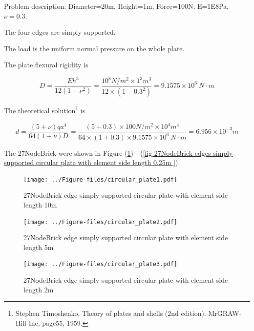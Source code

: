 \documentclass[fleqn,11pt]{article}
\begin{document}
Problem description: Diameter=20m, Height=1m, Force=100N, E=1E8Pa, $\nu=0.3$. 

The four edges are simply supported. 

The load is the uniform normal pressure on the whole plate. 


The plate flexural rigidity is 

\begin{equation}
  D=\frac{Eh^3}{12(1-\nu^2)}=\frac{10^8 N/m^2 \times 1^3 m^3 }{12 \times (1-0.3^2) }= 9.1575 \times 10^6 \ N\cdot m
\end{equation}

The theoretical solution\footnote{Stephen Timoshenko, Theory of plates and shells (2nd edition). MrGRAW-Hill Inc, page55, 1959.} is 

\begin{equation}
  d= \frac{(5+\nu)  q a^4}{64(1+\nu) D}=\frac{(5+0.3)\times 100 N/m^2 \times 10^4 m^4}{64\times(1+0.3) \times 9.1575 \times 10^6 \ N\cdot m}=6.956\times 10^{-3} m
\end{equation}



The 27NodeBrick were shown in Figure (\ref{fig 27NodeBrick edges simply supported circular plate with element side length 10m }) - (\ref{fig 27NodeBrick edges simply supported circular plate with element side length 0.25m }). 



\begin{figure}[H]
  \centering
  \texttt{[image: ../Figure-files/circular\_plate1.pdf]}
  \caption{27NodeBrick edge simply supported circular plate with element side length 10m }
  \label{fig 27NodeBrick edges simply supported circular plate with element side length 10m }
\end{figure}

\newpage

\begin{figure}[H]
  \centering
  \texttt{[image: ../Figure-files/circular\_plate2.pdf]}
  \caption{27NodeBrick edge simply supported circular plate with element side length 5m }
  \label{fig 27NodeBrick edges simply supported circular plate with element side length 5m }
\end{figure}


\begin{figure}[H]
  \centering
  \texttt{[image: ../Figure-files/circular\_plate3.pdf]}
  \caption{27NodeBrick edge simply supported circular plate with element side length 2m }
  \label{fig 27NodeBrick edges simply supported circular plate with element side length 2m }
\end{figure}
\end{document}
